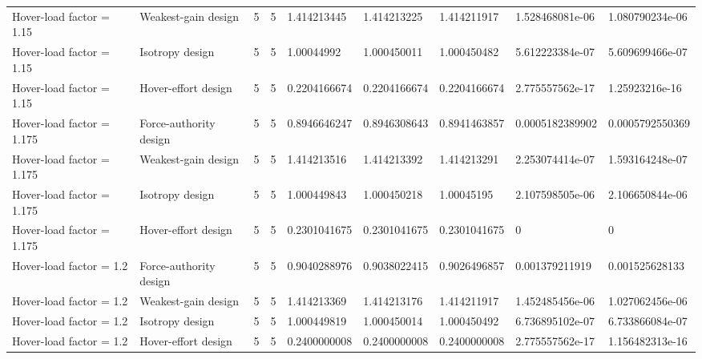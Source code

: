 \begin{tabular}{@{}lllllllll@{}}
Hover-load factor = 1.15 & Weakest-gain design & 5 & 5 & 1.414213445 & 1.414213225 & 1.414211917 & 1.528468081e-06 & 1.080790234e-06 \\
Hover-load factor = 1.15 & Isotropy design & 5 & 5 & 1.00044992 & 1.000450011 & 1.000450482 & 5.612223384e-07 & 5.609699466e-07 \\
Hover-load factor = 1.15 & Hover-effort design & 5 & 5 & 0.2204166674 & 0.2204166674 & 0.2204166674 & 2.775557562e-17 & 1.25923216e-16 \\
Hover-load factor = 1.175 & Force-authority design & 5 & 5 & 0.8946646247 & 0.8946308643 & 0.8941463857 & 0.0005182389902 & 0.0005792550369 \\
Hover-load factor = 1.175 & Weakest-gain design & 5 & 5 & 1.414213516 & 1.414213392 & 1.414213291 & 2.253074414e-07 & 1.593164248e-07 \\
Hover-load factor = 1.175 & Isotropy design & 5 & 5 & 1.000449843 & 1.000450218 & 1.00045195 & 2.107598505e-06 & 2.106650844e-06 \\
Hover-load factor = 1.175 & Hover-effort design & 5 & 5 & 0.2301041675 & 0.2301041675 & 0.2301041675 & 0 & 0 \\
Hover-load factor = 1.2 & Force-authority design & 5 & 5 & 0.9040288976 & 0.9038022415 & 0.9026496857 & 0.001379211919 & 0.001525628133 \\
Hover-load factor = 1.2 & Weakest-gain design & 5 & 5 & 1.414213369 & 1.414213176 & 1.414211917 & 1.452485456e-06 & 1.027062456e-06 \\
Hover-load factor = 1.2 & Isotropy design & 5 & 5 & 1.000449819 & 1.000450014 & 1.000450492 & 6.736895102e-07 & 6.733866084e-07 \\
Hover-load factor = 1.2 & Hover-effort design & 5 & 5 & 0.2400000008 & 0.2400000008 & 0.2400000008 & 2.775557562e-17 & 1.156482313e-16 \\
\bottomrule
\end{tabular}
